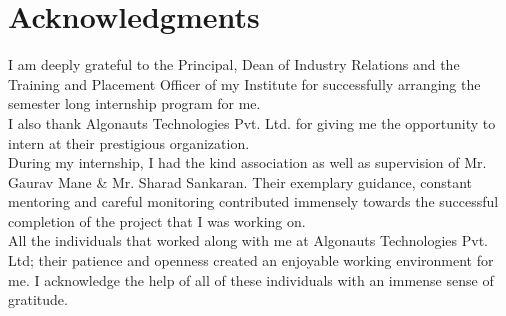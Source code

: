 
\chapter*{Acknowledgments}
\thispagestyle{empty}

I am deeply grateful to the Principal, Dean of Industry Relations and the Training and Placement Officer of my Institute for successfully arranging the semester long internship program for me.  \\ 

I also thank Algonauts Technologies Pvt. Ltd. for giving me the opportunity to intern at their prestigious organization.\\

During my internship, I had the kind association as well as supervision of Mr. Gaurav Mane \& Mr. Sharad Sankaran. Their exemplary guidance, constant mentoring and careful monitoring contributed immensely towards the successful completion of the project that I was working on.\\

All the individuals that worked along with me at Algonauts Technologies Pvt. Ltd; their patience and openness created an enjoyable working environment for me. I acknowledge the help of all of these individuals with an immense sense of gratitude. \\

